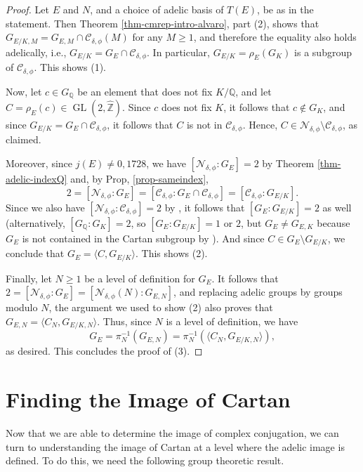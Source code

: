 \documentclass[11pt]{amsart}
\theoremstyle{definition}
\newcommand{\Q}{\mathbb{Q}}
\newcommand{\Z}{\mathbb{Z}}
\newcommand{\GL}{\operatorname{GL}}
\begin{document}
\begin{proof}
    Let $E$ and $N$, and a choice of adelic basis of $T(E)$, be as in the statement. Then Theorem \ref{thm-cmrep-intro-alvaro}, part (2), shows that $G_{E/K,M}=G_{E,M}\cap \mathcal{C}_{\delta, \phi}(M)$ for any $M\geq 1$, and therefore the equality also holds adelically, i.e., $G_{E/K}=G_E\cap \mathcal{C}_{\delta, \phi}$. In particular, $G_{E/K}=\rho_E(G_K)$ is a subgroup of $\mathcal{C}_{\delta, \phi}$. This shows (1).

    Now, let $c\in G_\Q$ be an element that does not fix $K/\Q$, and let $C=\rho_E(c)\in \GL(2,\widehat{\Z}).$ Since $c$ does not fix $K$, it follows that $c\not\in G_{K}$, and since $G_{E/K}=G_E\cap \mathcal{C}_{\delta, \phi}$, it follows that $C$ is not in $\mathcal{C}_{\delta, \phi}$. Hence, $C\in \mathcal{N}_{\delta, \phi} \setminus \mathcal{C}_{\delta, \phi}$, as claimed.

    Moreover, since $j(E)\neq 0,1728$, we have $[\mathcal{N}_{\delta, \phi} : G_E]=2$ by Theorem \ref{thm-adelic-indexQ} and, by Prop, \ref{prop-sameindex},
    $$2=[\mathcal{N}_{\delta, \phi}:G_{E}] = [\mathcal{C}_{\delta, \phi}:G_{E}\cap \mathcal{C}_{\delta, \phi}]=[\mathcal{C}_{\delta, \phi}:G_{E/K}].$$
    Since we also have $[\mathcal{N}_{\delta, \phi}:\mathcal{C}_{\delta, \phi}]=2$ by \cite[Thm. 1.1(1)]{lozano-galoiscm}, it follows that $[G_E:G_{E/K}]=2$ as well (alternatively, $[G_\Q:G_K]=2$, so $[G_E:G_{E/K}]=1$ or $2$, but $G_E\neq G_{E,K}$ because $G_E$ is not contained in the Cartan subgroup by \cite[Thm. 6.7]{lozano-galoiscm}). And since $C\in G_E \setminus G_{E/K}$, we conclude that $G_E=\langle C, G_{E/K} \rangle$. This shows (2).

    Finally, let $N\geq 1$ be a level of definition for $G_E$. It follows that $2=[\mathcal{N}_{\delta, \phi}:G_{E}]=[\mathcal{N}_{\delta, \phi}(N):G_{E,N}]$, and replacing adelic groups by groups modulo $N$, the argument we used to show (2) also proves that $G_{E,N}=\langle C_N, G_{E/K,N}\rangle$. Thus, since $N$ is a level of definition, we have
    $$G_E=\pi^{-1}_N(G_{E,N})=\pi^{-1}_{N}(\langle C_N, G_{E/K,N}\rangle),$$
    as desired. This concludes the proof of (3).
\end{proof}

\section{Finding the Image of Cartan}\label{sec-imageofcartan}

Now that we are able to determine the image of complex conjugation, we can turn to understanding the image of Cartan at a level where the adelic image is defined. To do this, we need the following group theoretic result.
\end{document}

